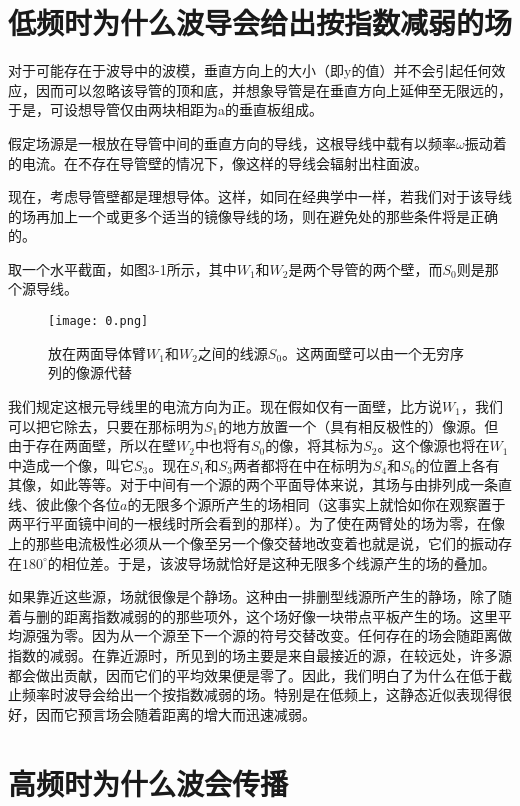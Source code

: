 \documentclass[bachelor]{thesis-uestc}
\begin{document}
\section{低频时为什么波导会给出按指数减弱的场}

对于可能存在于波导中的波模，垂直方向上的大小（即y的值）并不会引起任何效应，因而可以忽略该导管的顶和底，并想象导管是在垂直方向上延伸至无限远的，于是，可设想导管仅由两块相距为a的垂直板组成。

假定场源是一根放在导管中间的垂直方向的导线，这根导线中载有以频率$\omega$振动着的电流。在不存在导管壁的情况下，像这样的导线会辐射出柱面波。

现在，考虑导管壁都是理想导体。这样，如同在经典学中一样，若我们对于该导线的场再加上一个或更多个适当的镜像导线的场，则在避免处的那些条件将是正确的。

取一个水平截面，如图3-1所示，其中$W_1$和$W_2$是两个导管的两个壁，而$S_0$则是那个源导线。

\begin{figure}[h]
\texttt{[image: 0.png]}
\caption{放在两面导体臂$W_1$和$W_2$之间的线源$S_0$。这两面壁可以由一个无穷序列的像源代替}
\label{0} 
\end{figure}

我们规定这根元导线里的电流方向为正。现在假如仅有一面壁，比方说$W_1$，我们可以把它除去，只要在那标明为$S_1$的地方放置一个（具有相反极性的）像源。但由于存在两面壁，所以在壁$W_2$中也将有$S_0$的像，将其标为$S_2$。这个像源也将在$W_1$中造成一个像，叫它$S_3$。现在$S_1$和$S_3$两者都将在中在标明为$S_4$和$S_6$的位置上各有其像，如此等等。对于中间有一个源的两个平面导体来说，其场与由排列成一条直线、彼此像个各位$a$的无限多个源所产生的场相同（这事实上就恰如你在观察置于两平行平面镜中间的一根线时所会看到的那样）。为了使在两臂处的场为零，在像上的那些电流极性必须从一个像至另一个像交替地改变着也就是说，它们的振动存在$180^{\circ}$的相位差。于是，该波导场就恰好是这种无限多个线源产生的场的叠加。

如果靠近这些源，场就很像是个静场。这种由一排删型线源所产生的静场，除了随着与删的距离指数减弱的的那些项外，这个场好像一块带点平板产生的场。这里平均源强为零。因为从一个源至下一个源的符号交替改变。任何存在的场会随距离做指数的减弱。在靠近源时，所见到的场主要是来自最接近的源，在较远处，许多源都会做出贡献，因而它们的平均效果便是零了。因此，我们明白了为什么在低于截止频率时波导会给出一个按指数减弱的场。特别是在低频上，这静态近似表现得很好，因而它预言场会随着距离的增大而迅速减弱。

\section{高频时为什么波会传播}
\end{document}
